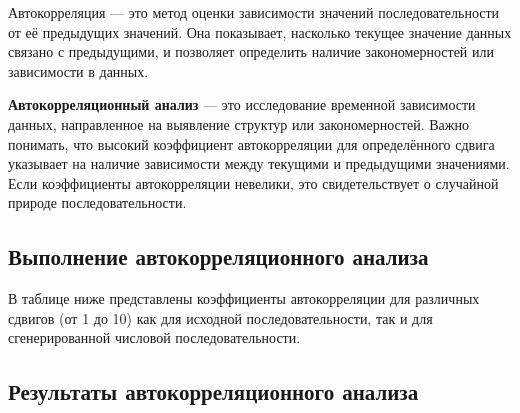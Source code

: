 Автокорреляция — это метод оценки зависимости значений последовательности от её предыдущих значений. Она показывает, насколько текущее значение данных связано с предыдущими, и позволяет определить наличие закономерностей или зависимости в данных.

\textbf{Автокорреляционный анализ} — это исследование временной зависимости данных, направленное на выявление структур или закономерностей. Важно понимать, что высокий коэффициент автокорреляции для определённого сдвига указывает на наличие зависимости между текущими и предыдущими значениями. Если коэффициенты автокорреляции невелики, это свидетельствует о случайной природе последовательности.

\subsection{Выполнение автокорреляционного анализа}

В таблице ниже представлены коэффициенты автокорреляции для различных сдвигов (от 1 до 10) как для исходной последовательности, так и для сгенерированной числовой последовательности.

\begin{table}[H]
	\centering
	\caption{Коэф. автокорреляции для заданной и сгенерированной ЧП}
\end{table}

\subsection{Результаты автокорреляционного анализа}

